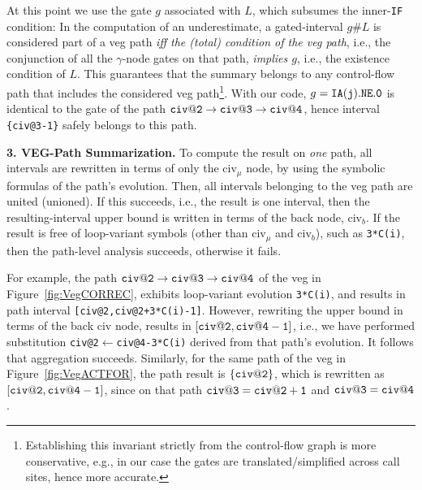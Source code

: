 \documentclass{sig-alternate}
\begin{document}
At this point we use the gate $g$ associated with $L$, which subsumes the
inner-{\tt IF} condition: In the computation
of an underestimate, a gated-interval $g\#L$ is considered part of a 
{\sc veg} path {\em iff the (total) condition of the {\sc veg} path}, i.e., 
the conjunction of all the $\gamma$-node gates on that path, {\em implies $g$}, 
i.e., the existence condition of $L$.  This guarantees that the summary belongs
to any control-flow path that includes the considered {\sc veg} path\footnote{
Establishing this invariant strictly from the control-flow graph is more
conservative, e.g., in our case the gates are translated/simplified across call sites,
hence more accurate.
}.
With our code, $g={\tt IA(j).NE.0}$ is identical to the gate of the path 
${\tt civ@2}\rightarrow{\tt civ@3}\rightarrow{\tt civ@4}$,
hence interval {\tt \{civ@3-1\}} safely belongs to this path.


\enlargethispage{\baselineskip}

\vspace{1ex}

{\bf 3. VEG-Path Summarization.} 
%
To compute the result on {\em one} path, all intervals are rewritten in terms of only the
{\sc civ}$_\mu$ node, by using the symbolic formulas of the path's evolution.
Then, all intervals belonging to the {\sc veg} path are united (unioned). 
If this succeeds, i.e., the result is one interval, then the resulting-interval upper 
bound is written in terms of the back node, {\sc civ}$_b$. If the result is free of
loop-variant symbols (other than {\sc civ}$_\mu$ and  {\sc civ}$_b$), such as {\tt 3*C(i)},
then the path-level analysis succeeds, otherwise it fails.

For example, the path ${\tt civ@2}\rightarrow{\tt civ@3}\rightarrow{\tt civ@4}$ 
of the {\sc veg} in Figure~\ref{fig:VegCORREC}, exhibits loop-variant evolution 
{\tt 3*C(i)}, and results in path interval {\tt [civ@2,civ@2+3*C(i)-1]}. 
%
However, rewriting the upper bound in terms of the back %
{\sc civ} node, results in $[{\tt civ@2},{\tt civ@4-1}]$,
i.e., we have performed substitution {\tt civ@2$\leftarrow$civ@4-3*C(i)}
derived from that path's evolution.
It follows that aggregation succeeds.
%
Similarly, for the same path of the {\sc veg} in  Figure~\ref{fig:VegACTFOR}, the
path result is $\{{\tt civ@2}\}$, which is rewritten as
 $[{\tt civ@2}, {\tt civ@4-1}]$, since on that path 
${\tt civ@3}={\tt civ@2+1}$
and ${\tt civ@3}={\tt civ@4}$.
\end{document}
